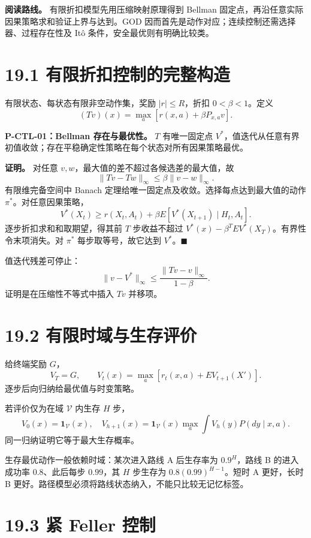 \documentclass[
  11pt,
  oneside]{book}
\begin{document}
\textbf{阅读路线。} 有限折扣模型先用压缩映射原理得到 Bellman 固定点，再沿任意实际因果策略求和验证上界与达到。GOD 因而首先是动作对应；连续控制还需选择器、过程存在性及 Itô 条件，安全最优则有明确比较类。

\section{19.1 有限折扣控制的完整构造}\label{ux6709ux9650ux6298ux6263ux63a7ux5236ux7684ux5b8cux6574ux6784ux9020}

有限状态、每状态有限非空动作集，奖励 \(|r|\le R\)，折扣 \(0<\beta<1\)。定义 \[(Tv)(x)=\max_a[r(x,a)+\beta P_{x,a}v].\]

\hypertarget{p-ctl-01}{}\label{p-ctl-01}

\textbf{P-CTL-01：Bellman 存在与最优性。} \(T\) 有唯一固定点 \(V^*\)，值迭代从任意有界初值收敛；存在平稳确定性策略在每个状态对所有因果策略最优。

\textbf{证明。} 对任意 \(v,w\)，最大值的差不超过各候选差的最大值，故 \[\|Tv-Tw\|_\infty\le\beta\|v-w\|_\infty.\] 有限维完备空间中 Banach 定理给唯一固定点及收敛。选择每点达到最大值的动作 \(\pi^*\)。对任意因果策略， \[V^*(X_t)\ge r(X_t,A_t)+\beta E[V^*(X_{t+1})\mid H_t,A_t].\] 逐步折扣求和和取期望，得其前 \(T\) 步收益不超过 \(V^*(x)-\beta^TEV^*(X_T)\)。有界性令末项消失。对 \(\pi^*\) 每步取等号，故它达到 \(V^*\)。\(\blacksquare\)

值迭代残差可停止： \[\|v-V^*\|_\infty\le\frac{\|Tv-v\|_\infty}{1-\beta}.\] 证明是在压缩性不等式中插入 \(Tv\) 并移项。

\section{19.2 有限时域与生存评价}\label{ux6709ux9650ux65f6ux57dfux4e0eux751fux5b58ux8bc4ux4ef7}

给终端奖励 \(G\)， \[V_T=G,\qquad
V_t(x)=\max_a[r_t(x,a)+E V_{t+1}(X')].\] 逐步后向归纳给最优值与时变策略。

若评价仅为在域 \(\mathcal V\) 内生存 \(H\) 步， \[V_0(x)=\mathbf1_{\mathcal V}(x),\quad
V_{h+1}(x)=\mathbf1_{\mathcal V}(x)\max_a\int V_h(y)P(dy\mid x,a).\] 同一归纳证明它等于最大生存概率。

生存最优动作一般依赖时域：某次进入路线 A 后生存率为 \(0.9^H\)，路线 B 的进入成功率 \(0.8\)、此后每步 \(0.99\)，其 \(H\) 步生存为 \(0.8(0.99)^{H-1}\)。短时 A 更好，长时 B 更好。路径模型必须将路线状态纳入，不能只比较无记忆标签。

\section{19.3 紧 Feller 控制}\label{ux7d27-feller-ux63a7ux5236}
\end{document}
